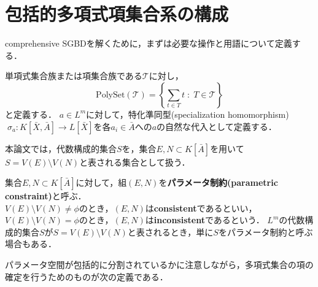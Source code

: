 \section{包括的多項式項集合系の構成}
comprehensive SGBDを解くために，まずは必要な操作と用語について定義する．
\par
単項式集合族または項集合族である$\mathscr{T}$に対し，$$\displaystyle \mathrm{PolySet}(\mathscr{T}) = \left\{ \sum_{t \in T} t \; : \; T \in \mathscr{T} \right\}$$
と定義する．
$a \in L^m$に対して，特化準同型(specialization homomorphism)$\; \sigma_a : K[\bar{X}, \bar{A}] \to L[\bar{X}]$を各$a_i \in \bar{A}$への$a$の自然な代入として定義する．
\par
本論文では，代数構成的集合$S$を，集合$E, N \subset K[\bar{A}]$を用いて$S = V(E) \setminus V(N)$と表される集合として扱う．
\begin{definition}
	\label{chapter04:definition:parameter_constraint}
	集合$E, N \subset K[\bar{A}]$に対して，組$(E, N)$を\textbf{パラメータ制約(parametric constraint)}と呼ぶ．\\
	$V(E) \setminus V(N) \ne \phi$のとき，$(E, N)$は\textbf{consistent}であるといい，$V(E) \setminus V(N) = \phi$のとき，$(E, N)$は\textbf{inconsistent}であるという．
	$L^m$の代数構成的集合$S$が$S = V(E) \setminus V(N)$と表されるとき，単に$S$をパラメータ制約と呼ぶ場合もある．
\end{definition}
パラメータ空間が包括的に分割されているかに注意しながら，多項式集合の項の確定を行うためのものが次の定義である．
